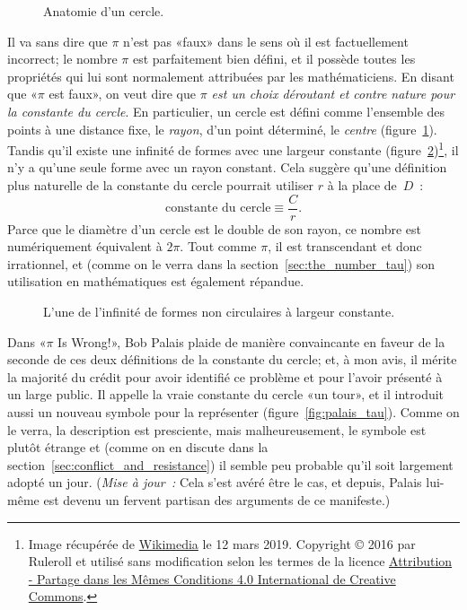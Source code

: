 \begin{figure}
\caption{Anatomie d'un cercle.\label{fig:circle}}
\end{figure}

Il va sans dire que $\pi$ n'est pas «\ns faux\ns » dans le sens où il
est factuellement incorrect\ns; le nombre $\pi$ est parfaitement bien défini,
et il possède toutes les propriétés qui lui sont normalement attribuées par
les mathématiciens. En disant que «\ns $\pi$ est faux\ns », on veut dire que
\emph{$\pi$ est un choix déroutant et contre nature pour la constante du
cercle}. En particulier, un cercle est défini comme l'ensemble des points à
une distance fixe, le \emph{rayon}, d'un point déterminé, le \emph{centre} (figure~\ref{fig:circle}).
Tandis qu'il existe une infinité de formes avec une
largeur constante (figure~\ref{fig:constant_width})\ns\footnote{Image
récupérée de
\href{https://commons.wikimedia.org/wiki/File:Reuleaux_triangle_roll.gif}{Wikimedia}
le 12 mars 2019. Copyright © 2016 par Ruleroll et utilisé sans
modification selon les termes de la licence
\href{https://creativecommons.org/licenses/by-sa/4.0/deed.fr}{Attribution -
Partage dans les Mêmes Conditions 4.0 International de Creative Commons}.}, il
n'y a qu'une seule forme avec un rayon constant. Cela suggère qu'une
définition plus naturelle de la constante du cercle pourrait utiliser $r$ à la
place de~$D$~:
\begin{equation}
\label{eq:circle_constant}
\mbox{constante du cercle} \equiv \frac{C}{r}.
\end{equation}
Parce que le diamètre d'un cercle est le double de son rayon, ce nombre est
numériquement équivalent à $2\pi$. Tout comme $\pi$, il est transcendant et donc
irrationnel, et (comme on le verra dans la section~\ref{sec:the_number_tau})
son utilisation en mathématiques est également répandue.

\begin{figure}
\caption{L'une de l'infinité de formes non circulaires à largeur
constante.\label{fig:constant_width}}
\end{figure}

Dans «\ns $\pi$ Is Wrong!\ns », Bob Palais plaide de manière convaincante en faveur
de la seconde de ces deux définitions de la constante du cercle\ns; et, à mon
avis, il mérite la majorité du crédit pour avoir identifié ce problème et pour
l'avoir présenté à un large public. Il appelle la vraie constante du cercle «\ns un
tour\ns », et il introduit aussi un nouveau symbole pour la représenter
(figure~\ref{fig:palais_tau}). Comme on le verra, la description est presciente,
mais malheureusement, le symbole est plutôt étrange et (comme on en discute dans la
section~\ref{sec:conflict_and_resistance}) il semble peu probable qu'il soit
largement adopté un jour. (\emph{Mise à jour~:} Cela s'est avéré être le cas,
et depuis, Palais lui-même est devenu un fervent partisan des arguments de
ce manifeste.)

